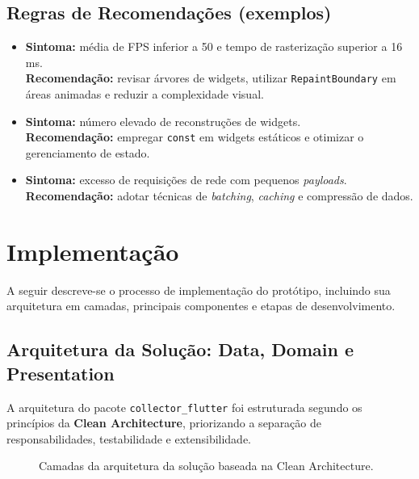 \documentclass[12pt,a4paper,oneside]{abntex2}
\begin{document}
\section{Regras de Recomendações (exemplos)}

\begin{itemize}
  \item \textbf{Sintoma:} média de FPS inferior a 50 e tempo de rasterização superior a 16 ms. \\
        \textbf{Recomendação:} revisar árvores de widgets, utilizar \texttt{RepaintBoundary} em áreas animadas e reduzir a complexidade visual.
  \item \textbf{Sintoma:} número elevado de reconstruções de widgets. \\
        \textbf{Recomendação:} empregar \texttt{const} em widgets estáticos e otimizar o gerenciamento de estado.
  \item \textbf{Sintoma:} excesso de requisições de rede com pequenos \textit{payloads}. \\
        \textbf{Recomendação:} adotar técnicas de \textit{batching}, \textit{caching} e compressão de dados.
\end{itemize}



\chapter{Implementação}

A seguir descreve-se o processo de implementação do protótipo, incluindo sua arquitetura em camadas, principais componentes e etapas de desenvolvimento.

\section{Arquitetura da Solução: Data, Domain e Presentation}

A arquitetura do pacote \texttt{collector\_flutter} foi estruturada segundo os princípios da \textbf{Clean Architecture}, priorizando a separação de responsabilidades, testabilidade e extensibilidade.  

\begin{figure}[H]
\centering
{}
\caption{Camadas da arquitetura da solução baseada na Clean Architecture.}
\label{fig:camadas}
\end{figure}
\end{document}
